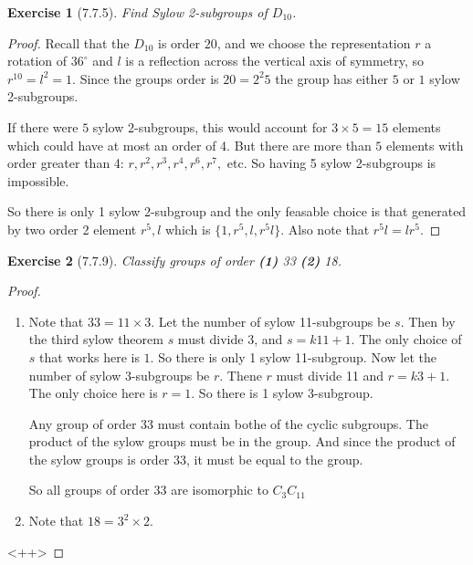 \documentclass[12pt]{article}
\newtheorem*{exer}{Exercise}
\begin{document}

\begin{exer}[7.7.5]

    Find Sylow 2-subgroups of $D_{10}$.

\end{exer}

\begin{proof}

    Recall that the $D_{10}$ is order $20$, and we choose the
    representation $r$ a rotation of $36^\circ$ and $l$ is a reflection
    across the vertical axis of symmetry, so $r^{10} = l^2 = 1$. Since
    the groups order is $20 = 2^2 5$ the group has either $5$ or $1$
    sylow 2-subgroups.

    If there were $5$ sylow 2-subgroups, this would account for $3
    \times 5 = 15$ elements which could have at most an order of 4. But
    there are more than $5$ elements with order greater than 4: $r, r^2,
    r^3, r^4, r^6, r^7,$ etc. So having 5 sylow 2-subgroups is
    impossible.

    So there is only 1 sylow 2-subgroup and the only feasable choice is
    that generated by two order 2 element $r^5, l$ which is $\{1, r^5,
    l, r^5l\}$. Also note that $r^5 l = l r^5$.

    

\end{proof}


\begin{exer}[7.7.9]

    Classify groups of order \textbf{(1)} 33 \textbf{(2)} 18.

\end{exer}

\begin{proof}

    \begin{enumerate}
        \item Note that $33 = 11 \times 3$. Let the number of sylow
            11-subgroups be $s$. Then by the third sylow theorem $s$
            must divide 3, and $s = k11 + 1$. The only choice of $s$
            that works here is $1$. So there is only 1 sylow
            11-subgroup. Now let the number of sylow 3-subgroups be $r$.
            Thene $r$ must divide 11 and $r = k3 + 1$. The only choice
            here is $r = 1$. So there is 1 sylow 3-subgroup.

            Any group of order 33 must contain bothe of the cyclic
            subgroups. The product of the sylow groups must be in the
            group. And since the product of the sylow groups is order
            33, it must be equal to the group. 

            So all groups of order 33 are isomorphic to $C_{3} C_{11}$

        \item Note that $18 = 3^2 \times 2$.

    \end{enumerate}<++>

\end{proof}
\end{document}

